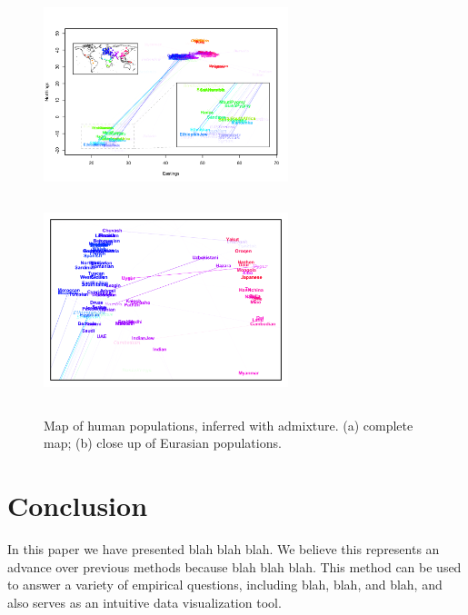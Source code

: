\documentclass[12pt]{article}
\begin{document}
\begin{figure}
	\centering
			{\includegraphics[width=2.8in,height=2.3in]{figs/globetrotter/globe_Ad_map_AfricaInset.png}}
			{\includegraphics[width=2.8in,height=2.3in]{figs/globetrotter/eurasia_Ad_map_indproc.png}}
	\caption{Map of human populations, inferred with admixture. (a) complete map; (b) close up of Eurasian populations.}\label{sfig:globe_ad_maps}
\end{figure}


\section*{Conclusion}
In this paper we have presented blah blah blah.  We believe this represents an advance over previous methods because blah blah blah.  This method can be used to answer a variety of empirical questions, including blah, blah, and blah, and also serves as an intuitive data visualization tool.
\end{document}
